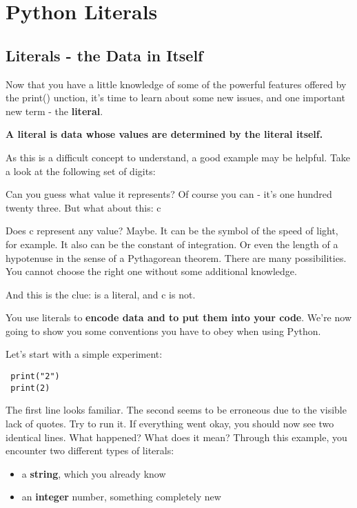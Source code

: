 \documentclass[a4paper,10pt]{article}
\begin{document}
\section{Python Literals}
\subsection{Literals - the Data in Itself}
Now that you have a little knowledge of some of the powerful features offered by the {\selectfont print()} unction, it's time to learn about some new issues, and one important new term - the \textbf{literal}.
\newline

\textbf{A literal is data whose values are determined by the literal itself.}
\newline

As this is a difficult concept to understand, a good example may be helpful. Take a look at the following set of digits:\newline
{}
\newline

Can you guess what value it represents? Of course you can - it's one hundred twenty three. But what about this:\newline
{\selectfont c}
\newline

Does {\selectfont c} represent any value? Maybe. It can be the symbol of the speed of light, for example. It also can be the constant of integration. Or even the length of a hypotenuse in the sense of a Pythagorean theorem. There are many possibilities. You cannot choose the right one without some additional knowledge.
\newline

And this is the clue: {} is a literal, and {\selectfont c} is not.
\newline

You use literals to \textbf{encode data and to put them into your code}. We're now going to show you some conventions you have to obey when using Python.
\newline

Let's start with a simple experiment:
\begin{verbatim}
 print("2")
 print(2)
\end{verbatim}


The first line looks familiar. The second seems to be erroneous due to the visible lack of quotes. Try to run it. If everything went okay, you should now see two identical lines. What happened? What does it mean? Through this example, you encounter two different types of literals:
\begin{itemize}
 \item a \textbf{string}, which you already know
 \item an \textbf{integer} number, something completely new
\end{itemize}
\end{document}
